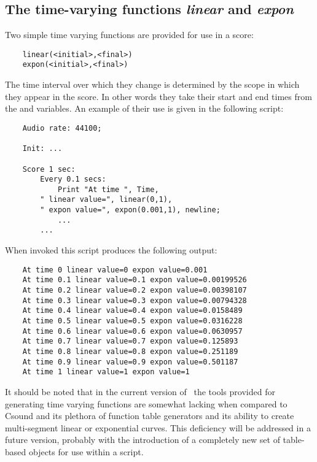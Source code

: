 \subsection{The time-varying functions \emph{linear} and \emph{expon}}
\label{section:linear_and_expon}
Two simple time varying functions are provided for use in a score:

\begin{verbatim}
    linear(<initial>,<final>)
    expon(<initial>,<final>)
\end{verbatim}

The time interval over which they change is determined by the scope
in which they appear in the score. In other words they take their
start and end times from the  and  variables.
An example of their use is given in the following script:

\begin{verbatim}
    Audio rate: 44100;

    Init: ...

    Score 1 sec:
        Every 0.1 secs:
            Print "At time ", Time,
		" linear value=", linear(0,1),
		" expon value=", expon(0.001,1), newline;
            ...
        ...
\end{verbatim}

When invoked this script produces the following output:

\begin{verbatim}
    At time 0 linear value=0 expon value=0.001
    At time 0.1 linear value=0.1 expon value=0.00199526
    At time 0.2 linear value=0.2 expon value=0.00398107
    At time 0.3 linear value=0.3 expon value=0.00794328
    At time 0.4 linear value=0.4 expon value=0.0158489
    At time 0.5 linear value=0.5 expon value=0.0316228
    At time 0.6 linear value=0.6 expon value=0.0630957
    At time 0.7 linear value=0.7 expon value=0.125893
    At time 0.8 linear value=0.8 expon value=0.251189
    At time 0.9 linear value=0.9 expon value=0.501187
    At time 1 linear value=1 expon value=1
\end{verbatim}

It should be noted that in the current version of \tao\ the tools
provided for generating time varying functions are somewhat lacking when
compared to Csound and its plethora of function table generators and its
ability to create multi-segment linear or exponential curves. This
deficiency will be addressed in a future version, probably with the
introduction of a completely new set of table-based objects for use within
a script.

